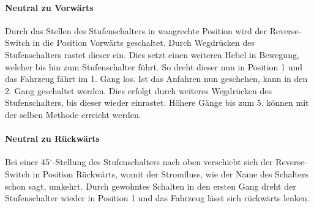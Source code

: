 \paragraph{Neutral zu Vorwärts}
Durch das Stellen des Stufenschalters in waagrechte Position wird der Reverse-Switch in die Position Vorwärts geschaltet. Durch Wegdrücken des Stufenschalters rastet dieser ein. Dies setzt einen weiteren Hebel in Bewegung, welcher bis hin zum Stufenschalter führt. So dreht dieser nun in Position 1 und das Fahrzeug fährt im 1. Gang los. Ist das Anfahren nun geschehen, kann in den 2. Gang geschaltet werden. Dies erfolgt durch weiteres Wegdrücken des Stufenschalters, bis dieser wieder einrastet. Höhere Gänge bis zum 5. können mit der selben Methode erreicht werden.

\paragraph{Neutral zu Rückwärts}
Bei einer 45$^\circ$-Stellung des Stufenschalters nach oben verschiebt sich der Reverse-Switch in Position Rückwärts, womit der Stromfluss, wie der Name des Schalters schon sagt, umkehrt. Durch gewohntes Schalten in den ersten Gang dreht der Stufenschalter wieder in Position 1 und das Fahrzeug lässt sich rückwärts lenken.